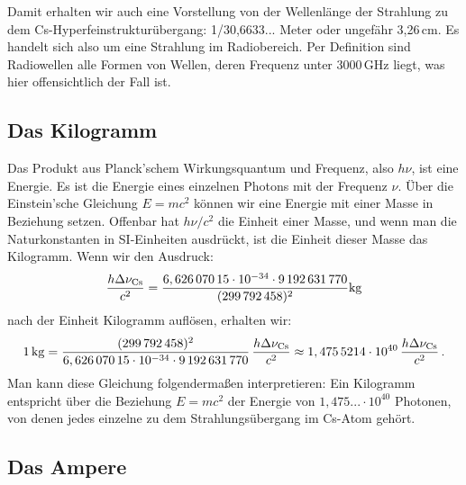 Damit erhalten wir auch eine Vorstellung von der Wellenl\"ange der Strahlung zu dem
Cs-Hyperfeinstruktur\"ubergang: 1/30,6633... Meter oder ungef\"ahr 3,26\,cm. Es handelt sich also
um eine Strahlung im Radiobereich. Per Definition sind 
Radiowellen alle Formen von Wellen,
deren Frequenz unter 3000\,GHz liegt, was hier offensichtlich der Fall ist. 

\subsection{Das Kilogramm}

Das Produkt aus Planck'schem Wirkungsquantum und Frequenz, also $h\nu$, ist eine Energie.
Es ist die Energie eines einzelnen Photons 
mit der Frequenz $\nu$. \"Uber die Einstein'sche
Gleichung $E=mc^2$ k\"onnen wir eine Energie mit einer Masse in Beziehung setzen. Offenbar hat
$h \nu/c^2$ die Einheit einer Masse, und wenn man die Naturkonstanten in SI-Einheiten
ausdr\"uckt, ist die Einheit dieser Masse das Kilogramm. Wenn wir den Ausdruck:
\begin{equation}
              \frac{h \Delta \nu_{\rm Cs}}{c^2} = 
       \frac{6,626\,070\,15 \cdot 10^{-34} \cdot 9\,192\,631\,770}{(299\,792\,458)^2} {\rm kg} 
\end{equation}  
nach der Einheit Kilogramm aufl\"osen, erhalten wir:
\begin{equation}
           1\,{\rm kg} =
       \frac{(299\,792\,458)^2}{6,626\,070\,15 \cdot 10^{-34} \cdot 9\,192\,631\,770} \, \frac{h \Delta \nu_{\rm Cs}}{c^2}
         \approx  1,475\,5214 \cdot 10^{40} \, \frac{h \Delta \nu_{\rm Cs}}{c^2}  \, .
\end{equation}  
Man kann diese Gleichung folgenderma\ss en interpretieren: Ein Kilogramm entspricht \"uber die Beziehung $E=mc^2$
der Energie von $1,475... \cdot 10^{40}$ Photonen, von denen jedes einzelne zu dem Strahlungs\"ubergang
im Cs-Atom geh\"ort. 

\subsection{Das Ampere}

